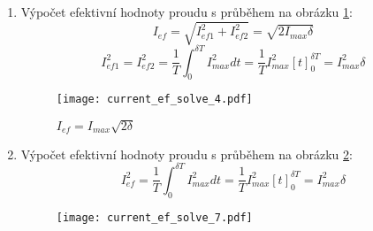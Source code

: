 {\begin{enumerate}
      \item Výpočet efektivní hodnoty proudu s průběhem na obrázku \ref{es:fig_current_ef_solve_4}:
        \begin{equation}\label{es:eq_Ief4_solve}
            I_{ef}=\sqrt{I_{ef1}^2+I_{ef2}^2}=\sqrt{2I_{max}\delta}
        \end{equation}
        {\footnotesize
          \begin{equation}\label{es:eq_Ief4}
              I_{ef1}^2=I_{ef2}^2
                      =\frac{1}{T}\int_0^{\delta T}{I_{max}^2}dt           
                      =\frac{1}{T}I_{max}^2[t]_0^{\delta T}=I_{max}^2\delta
          \end{equation}
        } %
        \begin{figure}[ht!]
          \centering
          \texttt{[image: current\_ef\_solve\_4.pdf]}
          \caption{$I_{ef}=I_{max}\sqrt{2\delta}$}\label{es:fig_current_ef_solve_4}
        \end{figure}

      \item Výpočet efektivní hodnoty proudu s průběhem na obrázku \ref{es:fig_current_ef_solve_7}:
          \begin{equation}\label{es:eq_current_ef_solve_7}
            I_{ef}^2 = \frac{1}{T}\int_0^{\delta T}{I_{max}^2}dt 
                     = \frac{1}{T}I_{max}^2[t]_0^{\delta T}=I_{max}^2\delta
          \end{equation}

          \begin{figure}[ht!]
            \centering
            \texttt{[image: current\_ef\_solve\_7.pdf]}
            \caption{ }
            \label{es:fig_current_ef_solve_7}
          \end{figure}
        

\end{enumerate}}
